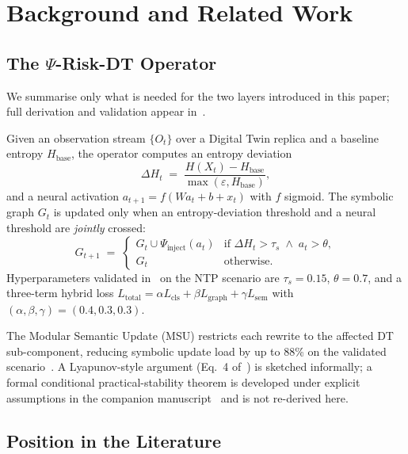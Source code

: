 \documentclass[futureinternet,article,submit,pdftex,moreauthors]{Definitions/mdpi}
\newcommand{\psiop}{\ensuremath{\Psi}}
\newcommand{\EntropyDeviation}{\ensuremath{\Delta H}}
\newcommand{\taus}{\ensuremath{\tau_{s}}}
\begin{document}
\section{Background and Related Work}
\label{sec:background}

\subsection{The \texorpdfstring{$\psiop$}{Psi}-Risk-DT Operator}

We summarise only what is needed for the two layers introduced in this
paper; full derivation and validation appear in~\cite{paper3}.

Given an observation stream $\{O_t\}$ over a Digital Twin replica and a
baseline entropy $H_{\mathrm{base}}$, the operator computes an entropy
deviation
\begin{equation}
\EntropyDeviation_t \;=\; \frac{H(X_t) - H_{\mathrm{base}}}{\max(\varepsilon,
H_{\mathrm{base}})},
\label{eq:dh}
\end{equation}
and a neural activation
$a_{t+1} = f(W a_t + b + x_t)$ with $f$ sigmoid. The symbolic graph
$G_t$ is updated only when an entropy-deviation threshold and a neural
threshold are \emph{jointly} crossed:
\begin{equation}
G_{t+1} \;=\;
\begin{cases}
G_t \cup \psiop_{\mathrm{inject}}(a_t) & \text{if } \EntropyDeviation_t > \taus
                                          \;\wedge\; a_t > \theta,\\
G_t                                    & \text{otherwise.}
\end{cases}
\label{eq:gate}
\end{equation}
Hyperparameters validated in~\cite{paper3} on the NTP scenario are
$\taus = 0.15$, $\theta = 0.7$, and a three-term hybrid loss
$L_{\mathrm{total}} = \alpha L_{\mathrm{cls}} + \beta L_{\mathrm{graph}}
+ \gamma L_{\mathrm{sem}}$ with $(\alpha,\beta,\gamma)=(0.4,0.3,0.3)$.

The Modular Semantic Update (MSU) restricts each rewrite to the affected
DT sub-component, reducing symbolic update load by up to 88\% on the
validated scenario~\cite{paper3}. A Lyapunov-style argument
(Eq.~4 of~\cite{paper3}) is sketched informally; a formal conditional
practical-stability theorem is developed under explicit assumptions in
the companion manuscript~\cite{paper5} and is not re-derived here.

\subsection{Position in the Literature}
\end{document}
